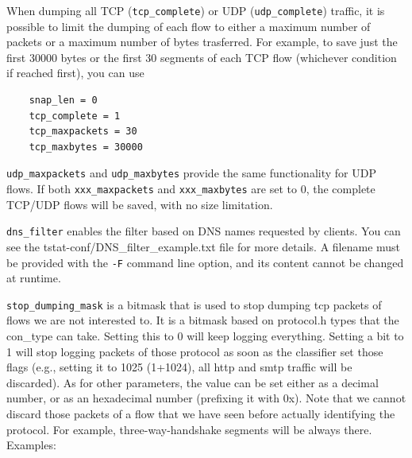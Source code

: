 \documentclass[11pt]{article}
\begin{document}
When dumping all TCP (\texttt{tcp\_complete}) or UDP (\texttt{udp\_complete}) traffic, 
it is possible to limit the dumping of each
flow to either a maximum number of packets or a maximum number of bytes trasferred.
For example, to save just the first 30000 bytes or the first 30 segments of
each TCP flow (whichever condition if reached first), you can use

\begin{small}\begin{verbatim}
    snap_len = 0
    tcp_complete = 1
    tcp_maxpackets = 30
    tcp_maxbytes = 30000
\end{verbatim}\end{small} \noindent
\texttt{udp\_maxpackets} and \texttt{udp\_maxbytes} provide the same functionality for UDP flows.
If both \texttt{xxx\_maxpackets} and \texttt{xxx\_maxbytes} are set to 0, the complete TCP/UDP 
flows will be saved, with no size limitation.



\texttt{dns\_filter} enables the filter based on DNS names requested by clients.
You can see the tstat-conf/DNS\_filter\_example.txt file for more details.
A filename must be provided with the \texttt{-F} command line option, and its content cannot 
be changed at runtime.



\texttt{stop\_dumping\_mask} is a bitmask that is used to stop dumping tcp packets of flows we
are not interested to.
It is a bitmask based on protocol.h types that the con\_type can take.
Setting this to 0 will keep logging everything. Setting a bit to 1 will stop logging
packets of those protocol as soon as the classifier set those flags (e.g., setting it to
1025 (1+1024), all http and smtp traffic will be discarded). As for other parameters, the
value can be set either as a decimal number, or as an hexadecimal number (prefixing it
with 0x).
Note that we cannot discard those packets of a flow that we have seen before
actually identifying the protocol. For example, three-way-handshake segments will be
always there.
Examples:
\end{document}
